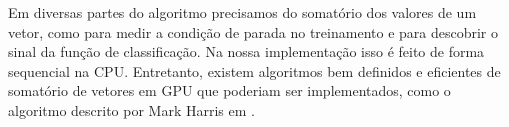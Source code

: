 Em diversas partes do algoritmo precisamos do somatório dos valores de um vetor, como para medir a condição de parada no treinamento e para descobrir o sinal da função de classificação. Na nossa implementação isso é feito de forma sequencial na CPU. Entretanto, existem algoritmos bem definidos e eficientes de somatório de vetores em GPU que poderiam ser implementados, como o algoritmo descrito por Mark Harris em \cite{harris2007optimizing}.

